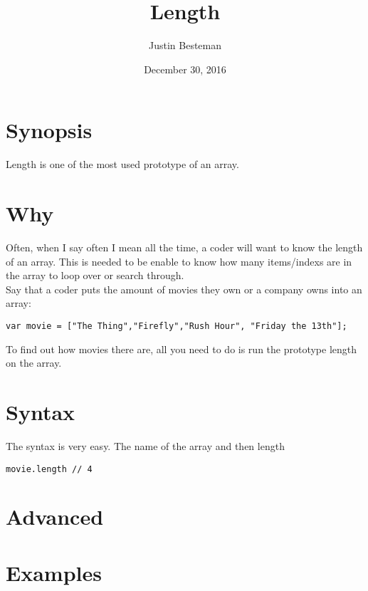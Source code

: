 \documentclass[12pt, letterpaper]{article}
\title{Length}
\author{Justin Besteman}
\date{December 30, 2016}
\begin{document}
\maketitle


\section*{Synopsis}

Length is one of the most used prototype of an array. 

\section*{Why}

Often, when I say often I mean all the time, a coder will want to know the length of an array. This is needed to be enable to 
know how many items/indexs are in the array to loop over or search through. \\
Say that a coder puts the amount of movies they own or a company owns into an array:
\begin{lstlisting}
var movie = ["The Thing","Firefly","Rush Hour", "Friday the 13th"];
\end{lstlisting}
To find out how movies there are, all you need to do is run the prototype length on the array.
\section*{Syntax}
The syntax is very easy. The name of the array and then length
\begin{lstlisting}
movie.length // 4
\end{lstlisting}
\section*{Advanced}

\section*{Examples}
\end{document}
